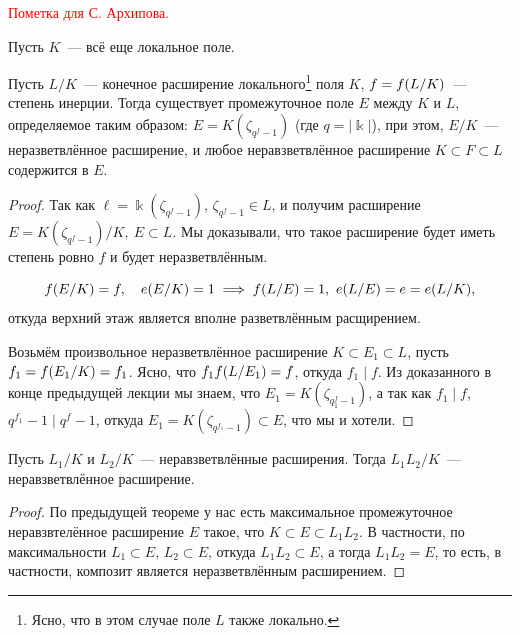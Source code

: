 	
	\textcolor{red}{Пометка для С. Архипова.}

	Пусть $K$~--- всё еще локальное поле. 

	\begin{theorem} 
		Пусть $L/K$~--- конечное расширение локального\footnote{Ясно, что в этом случае поле $L$ также локально.} поля $K$, $f = f\lr*{L/K}$~--- степень инерции. Тогда существует промежуточное поле $E$ между $K$ и $L$, определяемое таким образом: $E = K(\zeta_{q^f - 1})$ (где $q = |\Bbbk|$), при этом, $E/K$~--- неразветвлённое расширение, и любое неравзветвлённое расширение $K \subset F \subset L$ содержится в $E$. 
	\end{theorem}

	\begin{proof}
		Так как $\ell = \Bbbk(\zeta_{q^{f} - 1})$, $\zeta_{q^f - 1} \in L$,  и получим расширение $E = K(\zeta_{q^f  - 1})/K, \ E \subset L$. Мы доказывали, что такое расширение будет иметь степень ровно $f$ и будет неразветвлённым. 

		\[
			f\lr*{E/K} = f, \quad e\lr*{E/K} = 1 \implies f\lr*{L/E} = 1, \ e\lr*{L/E} = e = e\lr*{L/K},
		\]
		откуда верхний этаж является вполне разветвлённым расщирением. 

		Возьмём произвольное неразветвлённое расширение $K \subset E_1 \subset L$, пусть $f_1 = f\lr*{E_1/K}  = f_1$. Ясно, что $f_1 f\lr*{L/E_1} = f$, откуда $f_1 \mid f$. Из доказанного в конце предыдущей лекции мы знаем, что $E_1 = K(\zeta_{q^f_{1} - 1})$, а так как $f_1 \mid f$, $q^{f_1} - 1 \mid q^f - 1$, откуда $E_1 = K(\zeta_{q^{f_1} - 1}) \subset E$, что мы и хотели. 
	\end{proof}

	\begin{corollary}
		Пусть $L_1/K$ и $L_2/K$~--- неравзветвлённые расширения. Тогда $L_1 L_2/K$~--- неравзветвлённое расширение. 
	\end{corollary}
	\begin{proof}
		По предыдущей теореме у нас есть максимальное промежуточное неравзвтелённое расширение $E$ такое, что $K \subset E \subset L_1 L_2$. В частности, по максимальности $L_1 \subset E$, $L_2 \subset E$, откуда $L_1 L_2 \subset E$, а тогда $L_1 L_2 = E$, то есть, в частности, композит является неразветвлённым расширением. 
	\end{proof}

